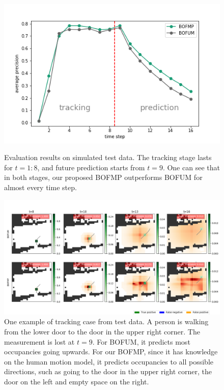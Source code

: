 \begin{figure}[hp]
  \centering
    \includegraphics[width=.8\textwidth]{figures/test_on_simulated_data.png}
    \caption[Evaluation results on simulated test data.]{Evaluation results on simulated test data. The tracking stage lasts for $t=1:8$, and future prediction starts from $t=9$. One can see that in both stages, our proposed BOFMP outperforms BOFUM for almost every time step.}
    \label{fig:simulated_test_data}

    \vspace*{\floatsep}

    \includegraphics[width=\textwidth]{figures/tracking_sample_for_simulated_data.png}
    \caption[One example of tracking case from simulated test data.]{One example of tracking case from test data. A person is walking from the lower door to the door in the upper right corner. The measurement is lost at $t=9$. For BOFUM, it predicts most occupancies going upwards. For our BOFMP, since it has knowledge on the human motion model, it predicts occupancies to all possible directions, such as going to the door in the upper right corner, the door on the left and empty space on the right.}
    \label{fig:tracking_simulated_data}
\end{figure} 

